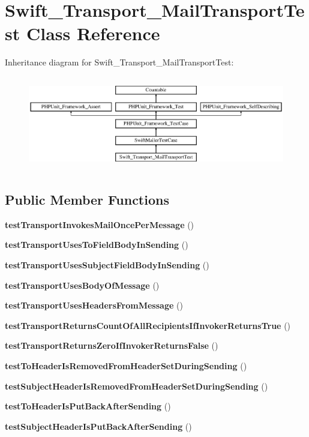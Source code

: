 \section{Swift\+\_\+\+Transport\+\_\+\+Mail\+Transport\+Test Class Reference}
\label{class_swift___transport___mail_transport_test}
Inheritance diagram for Swift\+\_\+\+Transport\+\_\+\+Mail\+Transport\+Test\+:\begin{figure}[H]
\begin{center}
\leavevmode
\includegraphics[height=4.129793cm]{class_swift___transport___mail_transport_test}
\end{center}
\end{figure}
\subsection*{Public Member Functions}
\begin{DoxyCompactItemize}
\item 
{\bf test\+Transport\+Invokes\+Mail\+Once\+Per\+Message} ()
\item 
{\bf test\+Transport\+Uses\+To\+Field\+Body\+In\+Sending} ()
\item 
{\bf test\+Transport\+Uses\+Subject\+Field\+Body\+In\+Sending} ()
\item 
{\bf test\+Transport\+Uses\+Body\+Of\+Message} ()
\item 
{\bf test\+Transport\+Uses\+Headers\+From\+Message} ()
\item 
{\bf test\+Transport\+Returns\+Count\+Of\+All\+Recipients\+If\+Invoker\+Returns\+True} ()
\item 
{\bf test\+Transport\+Returns\+Zero\+If\+Invoker\+Returns\+False} ()
\item 
{\bf test\+To\+Header\+Is\+Removed\+From\+Header\+Set\+During\+Sending} ()
\item 
{\bf test\+Subject\+Header\+Is\+Removed\+From\+Header\+Set\+During\+Sending} ()
\item 
{\bf test\+To\+Header\+Is\+Put\+Back\+After\+Sending} ()
\item 
{\bf test\+Subject\+Header\+Is\+Put\+Back\+After\+Sending} ()
\end{DoxyCompactItemize}
